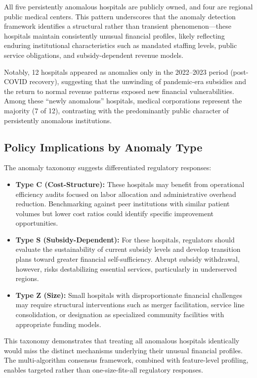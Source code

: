 \documentclass{ieeeaccess}
\begin{document}
All five persistently anomalous hospitals are publicly owned, and four are regional public medical centers. This pattern underscores that the anomaly detection framework identifies a structural rather than transient phenomenon---these hospitals maintain consistently unusual financial profiles, likely reflecting enduring institutional characteristics such as mandated staffing levels, public service obligations, and subsidy-dependent revenue models.

Notably, 12 hospitals appeared as anomalies only in the 2022--2023 period (post-COVID recovery), suggesting that the unwinding of pandemic-era subsidies and the return to normal revenue patterns exposed new financial vulnerabilities. Among these ``newly anomalous'' hospitals, medical corporations represent the majority (7 of 12), contrasting with the predominantly public character of persistently anomalous institutions.

\subsection{Policy Implications by Anomaly Type}
\label{subsec:policy_casestudy}

The anomaly taxonomy suggests differentiated regulatory responses:

\begin{itemize}
    \item \textbf{Type C (Cost-Structure):} These hospitals may benefit from operational efficiency audits focused on labor allocation and administrative overhead reduction. Benchmarking against peer institutions with similar patient volumes but lower cost ratios could identify specific improvement opportunities.
    \item \textbf{Type S (Subsidy-Dependent):} For these hospitals, regulators should evaluate the sustainability of current subsidy levels and develop transition plans toward greater financial self-sufficiency. Abrupt subsidy withdrawal, however, risks destabilizing essential services, particularly in underserved regions.
    \item \textbf{Type Z (Size):} Small hospitals with disproportionate financial challenges may require structural interventions such as merger facilitation, service line consolidation, or designation as specialized community facilities with appropriate funding models.
\end{itemize}

This taxonomy demonstrates that treating all anomalous hospitals identically would miss the distinct mechanisms underlying their unusual financial profiles. The multi-algorithm consensus framework, combined with feature-level profiling, enables targeted rather than one-size-fits-all regulatory responses.
\end{document}
